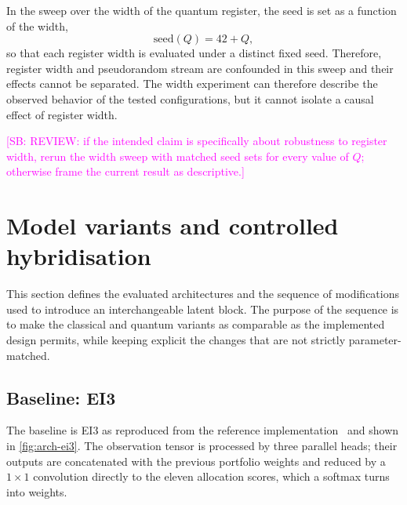 \documentclass[aps,floatfix,superscriptaddress,twocolumn,tightenlines,amsmath,amssymb,nofootinbib,10pt,longbibliography,prl]{revtex4-2}
\newcommand{\sam}[1]{\textcolor{magenta}{[SB: {#1}]}}
\begin{document}
In the sweep over the width of the quantum register, the seed is set as a function of the width,
%
\begin{equation}
  \mathrm{seed}(Q) = 42 + Q,
  \label{eq:seed-rule}
\end{equation}
%
so that each register width is evaluated under a distinct fixed seed. Therefore, register width and pseudorandom stream are confounded in this sweep and their effects cannot be separated. The width experiment can therefore describe the observed behavior of the tested configurations, but it cannot isolate a causal effect of register width.

\sam{REVIEW: if the intended claim is specifically about robustness to register width, rerun the width sweep with matched seed sets for every value of $Q$; otherwise frame the current result as descriptive.}

\section{Model variants and controlled hybridisation}
\label{sec:architectures}

This section defines the evaluated architectures and the sequence of modifications used to introduce an interchangeable latent block. The purpose of the sequence is to make the classical and quantum variants as comparable as the implemented design permits, while keeping explicit the changes that are not strictly parameter-matched.

\subsection{Baseline: EI3}
\label{subsec:arch-ei3}

The baseline is EI3 as reproduced from the reference implementation~\cite{RLportfolio} and shown in \ref{fig:arch-ei3}. The observation tensor is processed by three parallel heads; their outputs are concatenated with the previous portfolio weights and reduced by a $1\times1$ convolution directly to the eleven allocation scores, which a softmax turns into weights.
\end{document}
